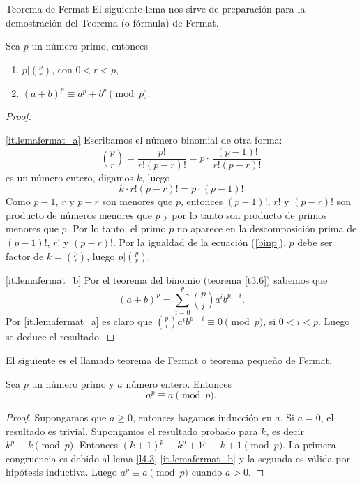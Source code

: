 \begin{section}{Teorema de Fermat}\label{seccion-teorema-de-fermat} 
El siguiente lema nos sirve de preparación para la demostración
del Teorema (o fórmula) de Fermat.

\begin{lema} \label{l4.3} Sea $p$ un número primo, entonces
\begin{enumerate}[label=\textit{\alph*)}]
\item\label{it.lemafermat_a}  $p|\displaystyle\binom{p}{r}$, con $0< r <p$,
\item\label{it.lemafermat_b}  $(a+b)^p \equiv a^p+b^p \pmod{p}$.
\end{enumerate}
\end{lema}
\begin{proof}
    \
    
    \ref{it.lemafermat_a} Escribamos el número binomial de otra forma: 
$$
\binom{p}{r}=\frac{p!}{r!(p-r)!}=p\cdot\,\frac{(p-1)!}{r!(p-r)!}
$$ 
es un número entero, digamos $k$, luego 
\begin{equation}\label{binp}
k \cdot r!(p-r)! = p \cdot(p-1)!
\end{equation}
Como $p-1$, $r$ y $p-r$ son menores que $p$, entonces  $(p-1)!$, $r!$ y $(p-r)!$ son producto de números menores que $p$ y por lo tanto son producto de primos menores que $p$. 
Por lo tanto, el primo $p$ no aparece en la descomposición prima de $(p-1)!$, $r!$ y $(p-r)!$. Por la igualdad de la ecuación (\ref{binp}), $p$ debe ser factor de $k = \binom{p}{r}$, luego $p|\binom{p}{r}$.

\ref{it.lemafermat_b} Por el teorema del binomio (teorema \ref{t3.6}) sabemos que
$$
(a+b)^p =\sum_{i=0}^{p} \binom{p}{i} a^ib^{p-i}.
$$
Por \ref{it.lemafermat_a} es claro que $ \binom{p}{i} a^ib^{p-i}\equiv 0 \pmod{p}$,
si $0<i<p$. Luego se deduce el resultado.
\end{proof}

El siguiente es el llamado teorema de Fermat o teorema pequeño de Fermat.

\begin{teorema}\label{t4.3} Sea $p$ un número primo y $a$ número
entero. Entonces
$$
a^p\equiv a\pmod{p}.
$$
\end{teorema}
\begin{proof} Supongamos que $a\ge 0$, entonces hagamos
inducción en $a$. Si $a=0$, el resultado es trivial. Supongamos el
resultado probado para $k$, es decir $k^p \equiv k \pmod{p}$.
Entonces $(k+1)^p \equiv k^p +1^p \equiv k+1 \pmod{p}$. La primera
congruencia es debido al lema \ref{l4.3} \ref{it.lemafermat_b} y la segunda es
válida por hipótesis inductiva. Luego $a^p\equiv a\pmod{p}$ cuando $a >0$.


\end{proof}
\end{section}
